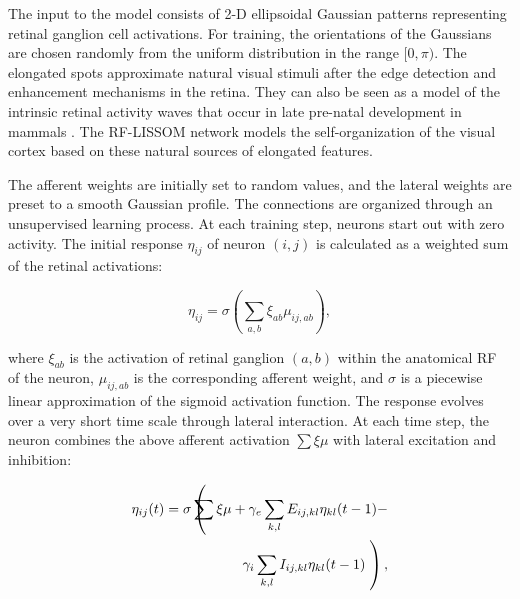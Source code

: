 \documentclass[10pt]{article}   %
\begin{document}
The input to the model consists of 2-D ellipsoidal Gaussian patterns
representing retinal ganglion cell activations.  For training, the
orientations of the Gaussians are chosen randomly from the uniform
distribution in the range $[0,\pi)$.  The elongated spots approximate
natural visual stimuli after the edge detection and enhancement
mechanisms in the retina.  They can also be seen as a model of the
intrinsic retinal activity waves that occur in late pre-natal
development in mammals \cite*{meister:synchronous}.  The RF-LISSOM
network models the self-organization of the visual cortex based on
these natural sources of elongated features.

The afferent weights are initially set to random values, and the
lateral weights are preset to a smooth Gaussian profile.  The
connections are organized through 
an unsupervised learning process. At each training step, neurons start
out with zero activity.  The initial response $\eta_{ij}$ of neuron
$(i,j)$ is calculated as a weighted sum of the retinal activations:

\begin{equation}
  \label{eq:initial}
  \eta_{ij} = \sigma \left( \sum_{a,b} \xi_{ab} \mu_{ij,ab} \right),
\end{equation} 

where $\xi_{ab}$ is the activation of retinal ganglion $(a,b)$ within
the anatomical RF of the neuron, $\mu_{ij,ab}$ is the corresponding
afferent weight, and $\sigma$ is a piecewise linear approximation of
the sigmoid activation function.  
The response evolves over a very short time scale through lateral
interaction.  At each time step, the neuron combines the above
afferent activation $\sum \xi \mu$ with lateral excitation and
inhibition:

\begin{latexonly}
  \newcommand{\parenheight}{\rule[-3.5ex]{0in}{7ex}}
  \newcommand{\columnadjust}{\hspace{-2em}}
  \begin{eqnarray}
    \label{eq:biollat}
    \eta_{ij}(t) = \sigma \left( \parenheight \right.
    & & \columnadjust \sum \xi \mu  +  \gamma_e \sum_{k,l} E_{ij,kl} \eta_{kl}(t-1) - \nonumber \\
    & & \columnadjust \gamma_i  \sum_{k,l} I_{ij,kl} \eta_{kl}(t-1) \left. \parenheight \right) ,
  \end{eqnarray}
\end{latexonly}
\end{document}
